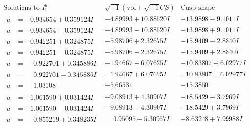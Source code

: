 \documentclass[1p]{elsarticle_modified}
\theoremstyle{definition}
\newcommand{\I}{\sqrt{-1}}
\begin{document}
$$\begin{array}{c|c|c}  
\text{Solutions to }I^u_{1}& \I (\text{vol} + \sqrt{-1}CS) & \text{Cusp shape}\\
 \hline 
\begin{aligned}
u &= -0.934654 + 0.359124 I\end{aligned}
 & -4.89993 + 10.88520 I & -13.9898 - 9.1011 I \\ \hline\begin{aligned}
u &= -0.934654 - 0.359124 I\end{aligned}
 & -4.89993 - 10.88520 I & -13.9898 + 9.1011 I \\ \hline\begin{aligned}
u &= -0.942251 + 0.324875 I\end{aligned}
 & -5.98706 + 2.32675 I & -15.9409 - 2.8840 I \\ \hline\begin{aligned}
u &= -0.942251 - 0.324875 I\end{aligned}
 & -5.98706 - 2.32675 I & -15.9409 + 2.8840 I \\ \hline\begin{aligned}
u &= \phantom{-}0.922701 + 0.345886 I\end{aligned}
 & -1.94667 - 6.07625 I & -10.83807 + 6.02977 I \\ \hline\begin{aligned}
u &= \phantom{-}0.922701 - 0.345886 I\end{aligned}
 & -1.94667 + 6.07625 I & -10.83807 - 6.02977 I \\ \hline\begin{aligned}
u &= \phantom{-}1.03108\phantom{ +0.000000I}\end{aligned}
 & -5.66531\phantom{ +0.000000I} & -15.3850\phantom{ +0.000000I} \\ \hline\begin{aligned}
u &= -1.061590 + 0.031424 I\end{aligned}
 & -9.08913 + 4.30907 I & -18.5429 - 3.7969 I \\ \hline\begin{aligned}
u &= -1.061590 - 0.031424 I\end{aligned}
 & -9.08913 - 4.30907 I & -18.5429 + 3.7969 I \\ \hline\begin{aligned}
u &= \phantom{-}0.855219 + 0.348235 I\end{aligned}
 & \phantom{-}0.95095 - 5.30967 I & -8.63248 + 7.99988 I \\ \hline\begin{aligned}

\end{aligned}
\end{array}$$
\end{document}
